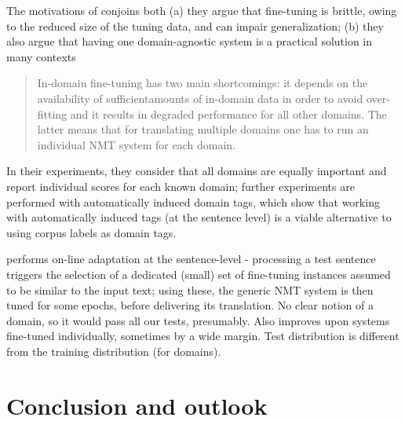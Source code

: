 \documentclass[11pt]{article}
\begin{document}
The motivations of \cite{Tars18multidomain} conjoins both (a) they argue that fine-tuning is brittle, owing to the reduced size of the tuning data, and can impair generalization; (b) they also argue that having one domain-agnostic system is a practical solution in many contexts
\begin{quote}
  In-domain fine-tuning has two main shortcomings: it depends on the availability of sufficientamounts of in-domain data in order to avoid over-fitting and it results in degraded performance for all other domains. The latter means that for translating multiple domains one has to run an individual NMT system for each domain.
\end{quote}
In their experiments, they consider that all domains are equally important and report individual scores for each known domain; further experiments are performed with automatically induced domain tags, which show that working with automatically induced tags (at the sentence level) is a viable alternative to using corpus labels as domain tags.

\cite{Farajian17multidomain} performs on-line adaptation at the sentence-level - processing a test sentence triggers the selection of a dedicated (small) set of fine-tuning instances assumed to be similar to the input text; using these, the generic NMT system is then tuned for some epochs, before delivering its translation. No clear notion of a domain, so it would pass all our tests, presumably.  Also improves upon systems fine-tuned individually, sometimes by a wide margin. Test distribution is different from the training distribution (for domains). 

\section{Conclusion and outlook \label{sec:conclusion}}





\end{document}
